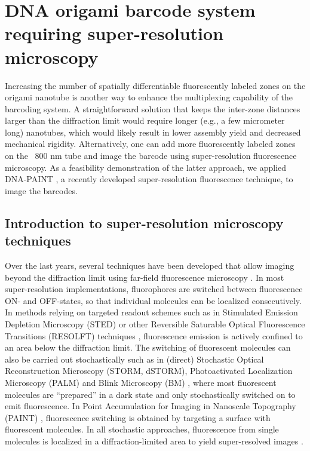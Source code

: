 \section{DNA origami barcode system requiring super-resolution microscopy}
Increasing the number of spatially differentiable fluorescently labeled zones on 
the origami nanotube is another way to enhance the multiplexing capability of the 
barcoding system. A straightforward solution that keeps the inter-zone distances larger 
than the diffraction limit would require longer (e.g., a few micrometer long) nanotubes, 
which would likely result in lower assembly yield and decreased mechanical rigidity. 
Alternatively, one can add more fluorescently 
labeled zones on the ~800 nm tube and image the barcode using super-resolution 
fluorescence microscopy. As a feasibility demonstration of the latter approach, we 
applied DNA-PAINT \citep{jungmann_single-molecule_2010}, a recently developed super-resolution fluorescence technique, to 
image the barcodes. 

\subsection{Introduction to super-resolution microscopy techniques}
Over the last years, several techniques have been developed that 
allow imaging beyond the diffraction limit using far-field fluorescence microscopy \citep{hell_far-field_2007,hell_microscopy_2009,huang_breaking_2010,vogelsang_make_2010,walter_-it-yourself_2008}. 
In most super-resolution implementations, fluorophores are switched between 
fluorescence ON- and OFF-states, so that individual molecules can be localized 
consecutively. In methods relying on targeted readout schemes such as in Stimulated 
Emission Depletion Microscopy  (STED) \citep{hell_breaking_1994} or other Reversible Saturable Optical 
Fluorescence Transitions  (RESOLFT) techniques \citep{hell_far-field_2007}, fluorescence emission is actively 
confined to an area below the diffraction limit. The switching of fluorescent molecules 
can also be carried out stochastically such as in (direct) Stochastic Optical Reconstruction 
Microscopy \citep{heilemann_subdiffraction-resolution_2008,rust_sub-diffraction-limit_2006} (STORM, dSTORM), Photoactivated Localization Microscopy \citep{betzig_imaging_2006}
(PALM) and Blink Microscopy (BM) \citep{steinhauer_superresolution_2008}, where most fluorescent molecules are 
“prepared” in a dark state and only stochastically switched on to emit fluorescence. In 
Point Accumulation for Imaging in Nanoscale Topography (PAINT) \citep{sharonov_wide-field_2006}, fluorescence 
switching is obtained by targeting a surface with fluorescent molecules. In all stochastic 
approaches, fluorescence from single molecules is localized  in a diffraction-limited 
area to yield super-resolved images \citep{yildiz_myosin_2003,yildiz_kinesin_2004}.

